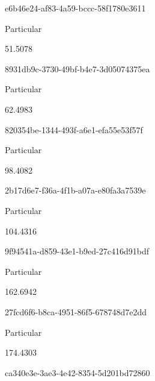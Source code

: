 \documentclass[
  11pt,
  a4paper,
  DIV=11,
  numbers=noendperiod]{scrartcl}
\begin{document}
e6b46e24-af83-4a59-bccc-58f1780e3611

\n      

Particular

\n      

51.5078

\n    

\n    

\n      

8931db9c-3730-49bf-b4e7-3d05074375ea

\n      

Particular

\n      

62.4983

\n    

\n    

\n      

820354be-1344-493f-a6e1-efa55e53f57f

\n      

Particular

\n      

98.4082

\n    

\n    

\n      

2b17d6e7-f36a-4f1b-a07a-e80fa3a7539e

\n      

Particular

\n      

104.4316

\n    

\n    

\n      

9f94541a-d859-43e1-b9ed-27c416d91bdf

\n      

Particular

\n      

162.6942

\n    

\n    

\n      

27fcd6f6-b8ca-4951-86f5-678748d7e2dd

\n      

Particular

\n      

174.4303

\n    

\n    

\n      

ca340e3e-3ae3-4e42-8354-5d201bd72860
\end{document}
